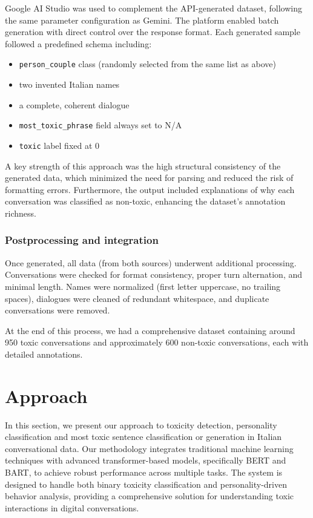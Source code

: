 \documentclass[conference]{IEEEtran}
\begin{document}
Google AI Studio was used to complement the API-generated dataset, following the same parameter configuration as Gemini. The platform enabled batch generation with direct control over the response format. Each generated sample followed a predefined schema including:  
\begin{itemize}
    \item \texttt{person\_couple} class (randomly selected from the same list as above)
    \item two invented Italian names
    \item a complete, coherent dialogue
    \item \texttt{most\_toxic\_phrase} field always set to N/A
    \item \texttt{toxic} label fixed at 0
\end{itemize}
A key strength of this approach was the high structural consistency of the generated data, which minimized the need for parsing and reduced the risk of formatting errors. Furthermore, the output included explanations of why each conversation was classified as non-toxic, enhancing the dataset’s annotation richness.

\subsubsection{Postprocessing and integration}

Once generated, all data (from both sources) underwent additional processing. Conversations were checked for format consistency, proper turn alternation, and minimal length. Names were normalized (first letter uppercase, no trailing spaces), dialogues were cleaned of redundant whitespace, and duplicate conversations were removed.

At the end of this process, we had a comprehensive dataset containing around 950 toxic conversations and approximately 600 non-toxic conversations, each with detailed annotations.

\section{Approach}

In this section, we present our approach to toxicity detection, personality classification and most toxic sentence classification or generation in Italian conversational data. Our methodology integrates traditional machine learning techniques with advanced transformer-based models, specifically BERT and BART, to achieve robust performance across multiple tasks. The system is designed to handle both binary toxicity classification and personality-driven behavior analysis, providing a comprehensive solution for understanding toxic interactions in digital conversations.
\end{document}
